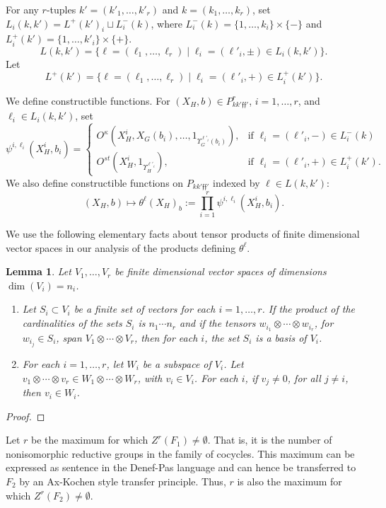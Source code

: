 \documentclass[12pt]{amsart}
\def\Y{\Upsilon}
\def\s{{\mathfrak{f}}}
\theoremstyle{plain}
\newtheorem{lem}[thm]{Lemma}
\theoremstyle{definition}
\begin{document}
For any $r$-tuples $k'=(k'_1,\ldots,k'_r)$ and $k=(k_1,\ldots,k_r)$, set
$L_i(k,k') = L^+(k')_i\sqcup L^-_i(k)$, where $L^-_i(k) =
\{1,\ldots,k_i\}\times\{-\}$ and $L^+_i(k') =
\{1,\ldots,k'_i\}\times\{+\}$.
\[
L(k,k') = \{\ell = (\ell_1,\ldots,\ell_r)\mid \ell_i=(\ell'_i,\pm)\in L_i(k,k')\}.
\]
Let
\[
L^+(k') = \{\ell = (\ell_1,\ldots,\ell_r)\mid \ell_i=(\ell'_i,+)\in L^+_i(k')\}.
\]

We define constructible functions.  For $(X_H,b)\in
P^r_{kk'\s \s'}$,  $i=1,\ldots,r$, and $\ell_i\in L_i(k,k')$,
set
\[
\psi^{i,\ell_i}(X_H^i,b_i) = 
\begin{cases}   
  O^\kappa(X_H^i,X_G(b_i),\ldots,1_{\Y_G^{\ell'_i}(b_i)}),
   & \text{if } \ell_i = (\ell'_i,-)\in L^-_i(k) \\
  O^{st}(X_H^i,1_{\Y_H^{\ell'_i}}),
   & \text{if } \ell_i = (\ell'_i,+)\in L^+_i(k').
\end{cases}
\]
 We also define constructible functions
on $P_{kk'\s \s'}$ indexed by $\ell\in L(k,k')$:
\[
(X_H,b)\mapsto \theta^\ell(X_H)_b := \prod_{i=1}^r \psi^{i,\ell_i}(X_H^i,b_i).
\]

We use the following elementary facts about tensor products of
finite dimensional vector spaces in our analysis of the products
defining $\theta^\ell$.

\begin{lem}\label{thm:tensor}
Let $V_1,\ldots,V_r$ be finite dimensional vector spaces of
dimensions $\dim(V_i) = n_i$.  
\begin{enumerate}
\item 
Let $S_i\subset V_i$ be a finite set of vectors for each
  $i = 1,\ldots,r$. 
If the product of the cardinalities of the
  sets $S_i$ is $n_1\cdots n_r$ and if the tensors $w_{i_1}\otimes
 \cdots\otimes w_{i_r}$, for $w_{i_j}\in S_i$, span 
$V_1\otimes\cdots\otimes V_r$, then
  for each $i$, the set $S_i$ is a basis of $V_i$.
\item For each $i=1,\ldots,r$, let $W_i$ be a subspace of
$V_i$.  Let $v_{1}\otimes \cdots \otimes v_{r} \in
  W_1\otimes\cdots\otimes W_r$, with $v_{i}\in V_i$.  For
  each $i$, if $v_{j}\ne0$, for all $j\ne i$, then
  $v_{i}\in W_i$.
\end{enumerate}
\end{lem}

\begin{proof}
\end{proof}

Let $r$ be the maximum for which $Z^r(F_1)\ne\emptyset$.  That is, it is
the number of nonisomorphic reductive groups in the family of
cocycles.  This maximum can be expressed as sentence in the Denef-Pas
language and can hence be transferred to $F_2$ by an Ax-Kochen style
transfer principle.  Thus, $r$ is also the maximum for which
$Z^r(F_2)\ne\emptyset$.
\end{document}
